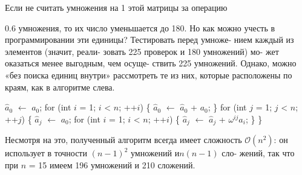 Если не считать умножения на 1 этой матрицы за операцию
\begin{wraptable}{}{0.6\textwidth}
умножения, то их число уменьшается до 180. \linebreak
Но как можно учесть в программировании \linebreak
эти единицы? Тестировать перед умноже­- \linebreak
нием каждый из элементов (значит, реали­- \linebreak
зовать 225 проверок и 180 умножений) мо­- \linebreak
жет оказаться менее выгодным, чем осуще­- \linebreak
ствить 225 умножений. Однако, можно «без \linebreak
поиска единиц внутри» рассмотреть те из \linebreak
них, которые расположены по краям, как в \linebreak
алгоритме слева.
\end{wraptable}
\noindent $\hat a_0$ $\longleftarrow$ $a_0$; \newline
for (int $i$ = 1; $i$ < $n$; ++$i$) \{ \newline
 $\hat a_0$ $\longleftarrow$ $\hat a_0$ + $a_0$; \newline
\} \newline
for (int $j$ = 1; $j$ < $n$; ++$j$) \{ \newline
$\hat a_j$ $\longleftarrow$ $a_0$; \newline
for (int $i$ = 1; $i$ < $n$; ++$i$) \{ \newline
$\hat a_j$ $\longleftarrow$ $\hat a_j$ + $\omega^{ij}a_i$; \newline
\} \} \newline

Несмотря на это, полученный алгоритм всегда имеет сложность \linebreak
$\mathcal{O}(n^2)$: он использует в точности $(n - 1)^2$ умножений и$n(n - 1)$ сло­- \linebreak
жений, так что при $n$ = 15 имеем 196 умножений и 210 сложений. \ 

